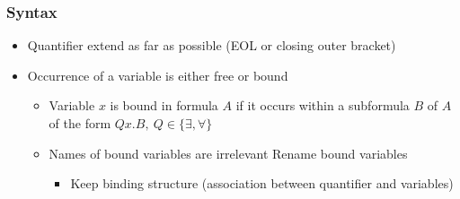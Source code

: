 \subsubsection{Syntax}
\begin{itemize}
     Set of function symbols $\mathcal{F}$ and set of predicate symbols $\mathcal{P}$
        \begin{itemize}
            \item $f^i$/$p^i$ indicate the arity of function $f$/predicate $p$
        \end{itemize}
     For set of variables $\mathcal{V}$, the smallest set where:
        \begin{itemize}
            \item $x \in \text{ Term if } x \in \mathcal{V}$
            \item $f^n(t_1, \dots ,t_n) \in \text{ Term if } f^n \in \mathcal{F} \text{ and } t_j \in \text{ Term } \forall 1 \le j \le n$
        \end{itemize}
     Smallest set where:
        \begin{itemize}
            \item $\perp \in \text{Form}$
            \item $p^n(t_1, \dots , t_n) \in \text{Form if } p^n \in \mathcal{P} \text{ and } t_j \in \text{Term } \forall 1 \le j \le n$
            \item $A \circ B \in \text{Form if } A \in \text{Form, } B \in \text{Form, and } \circ \in \{\wedge, \vee, \to\}$
            \item $Qx. A \in \text{Form if } A \in \text{Form, } x \in \mathcal{V}, \text{ and } Q \in \{\forall, \exists\}$
        \end{itemize}
    \item Quantifier extend as far as possible (EOL or closing outer bracket)
    \item Occurrence of a variable is either free or bound
        \begin{itemize}
            \item Variable $x$ is bound in formula $A$ if it occurs within a subformula $B$ of $A$ of the form $Qx.B,\ Q \in \{\exists, \forall\}$
            \item Names of bound variables are irrelevant
             Rename bound variables
                \begin{itemize}
                    \item Keep binding structure (association between quantifier and variables)

\end{itemize}
\end{itemize}
\end{itemize}
